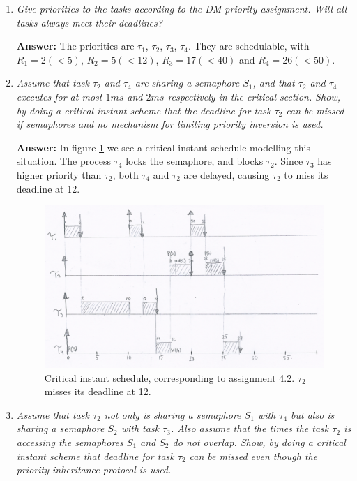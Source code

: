 \documentclass[a4paper,10pt]{article}
\newcommand{\answer}{\textbf{Answer: }}
\begin{document}
\begin{enumerate}
	\item \emph{Give priorities to the tasks according to the DM priority assignment. Will all tasks always meet their deadlines?}
	
	\answer The priorities are $\tau_1$, $\tau_2$, $\tau_3$, $\tau_4$. They are schedulable, with $R_1 = 2 (<5)$, $R_2 = 5 (<12)$, $R_3 = 17 (< 40)$ and $R_4 = 26 (<50)$.

	\item \emph{Assume that task $\tau_2$ and $\tau_4$ are sharing a semaphore $S_1$, and that $\tau_2$ and $\tau_4$ executes for at most $1 ms$ and $2 ms$ respectively in the critical section. Show, by doing a critical instant scheme that the deadline for task $\tau_2$ can be missed if semaphores and no mechanism for limiting priority inversion is used.}
	
	\answer In figure \ref{4_2} we see a critical instant schedule modelling this situation. The process $\tau_4$ locks the semaphore, and blocks $\tau_2$. Since $\tau_3$ has higher priority than $\tau_2$, both $\tau_4$ and $\tau_2$ are delayed, causing $\tau_2$ to miss its deadline at 12.

	\begin{figure}
	\includegraphics[scale=0.4]{4_2_low}
	\caption{Critical instant schedule, corresponding to assignment 4.2. $\tau_2$ misses its deadline at 12.}
	\label{4_2}
	\end{figure}

	\item \emph{Assume that task $\tau_2$ not only is sharing a semaphore $S_1$ with $\tau_4$ but also is sharing a semaphore $S_2$ with task $\tau_3$. Also assume that the times the task $\tau_2$ is accessing the semaphores $S_1$ and $S_2$ do not overlap. Show, by doing a critical instant scheme that deadline for task $\tau_2$ can be missed even though the priority inheritance protocol is used.}
	

\end{enumerate}
\end{document}
